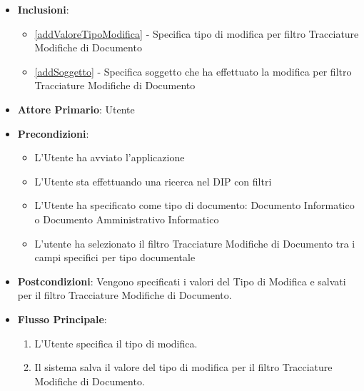 \begin{itemize}
\begin{enumerate}
            \end{enumerate}
      \item \textbf{Inclusioni}: 
      \begin{itemize}
            \item \ref{addValoreTipoModifica} - Specifica tipo di modifica per filtro Tracciature Modifiche di Documento
            \item \ref{addSoggetto} - Specifica soggetto che ha effettuato la modifica per filtro Tracciature Modifiche di Documento
      \end{itemize}
\end{itemize}

\begin{itemize}
      \item \textbf{Attore Primario}: Utente
      \item \textbf{Precondizioni}: 
      \begin{itemize}            
            \item L'Utente ha avviato l'applicazione
            \item L'Utente sta effettuando una ricerca nel DIP con filtri
            \item L'Utente ha specificato come tipo di documento: Documento Informatico o Documento Amministrativo Informatico
            \item L'utente ha selezionato il filtro Tracciature Modifiche di Documento tra i campi specifici per tipo documentale
      \end{itemize}
      \item \textbf{Postcondizioni}: Vengono specificati i valori del Tipo di Modifica e salvati per il filtro Tracciature Modifiche di Documento.
      \item \textbf{Flusso Principale}:
            \begin{enumerate}
                  \item L'Utente specifica il tipo di modifica.
                  \item Il sistema salva il valore del tipo di modifica per il filtro Tracciature Modifiche di Documento.
            \end{enumerate}
\end{itemize}

